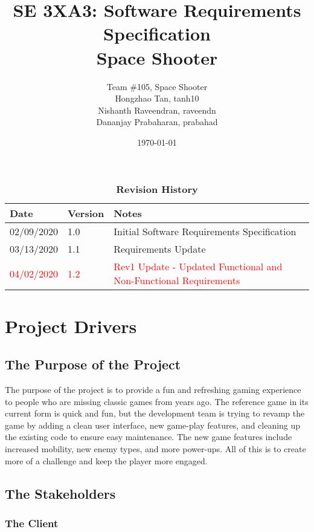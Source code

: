 \documentclass[12pt, titlepage]{article}
\title{SE 3XA3: Software Requirements Specification\\Space Shooter}
\author{Team \#105, Space Shooter
		\\ Hongzhao Tan, tanh10
		\\ Nishanth Raveendran, raveendn
		\\ Dananjay Prabaharan, prabahad
}
\date{\today}
\begin{document}
\maketitle

\tableofcontents
\listoftables
\listoffigures

\begin{table}[H]
\caption{\bf Revision History}
\begin{tabularx}{\textwidth}{p{3cm}p{2cm}X}
\toprule {\bf Date} & {\bf Version} & {\bf Notes}\\
\midrule
02/09/2020 & 1.0 & Initial Software Requirements Specification\\
03/13/2020 & 1.1 & Requirements Update\\
\textcolor{red}{04/02/2020} & \textcolor{red}{1.2} & \textcolor{red}{Rev1 Update - Updated Functional and Non-Functional Requirements}\\
\bottomrule
\end{tabularx}
\end{table}


\newpage


\section{Project Drivers}

\subsection{The Purpose of the Project}

The purpose of the project is to provide a fun and refreshing gaming experience to people who are missing classic games from years ago. The reference game in its current form is quick and fun, but the development team is trying to revamp the game by adding a clean user interface, new game-play features, and cleaning up the existing code to ensure easy maintenance. The new game features include increased mobility, new enemy types, and more power-ups. All of this is to create more of a challenge and keep the player more engaged.

\subsection{The Stakeholders}

\subsubsection{The Client}
\end{document}
